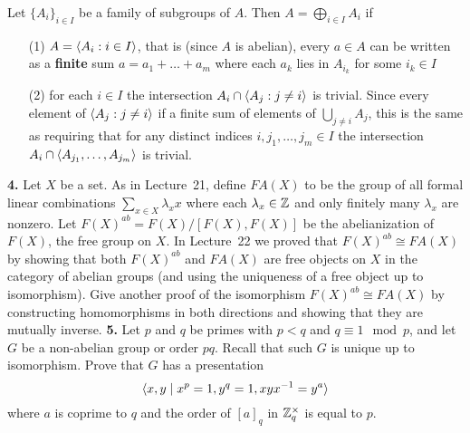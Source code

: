 \documentclass[12pt]{amsart}
\begin{document}
Let $\{A_i\}_{i\in I}$ be a family of subgroups of $A$. Then $A=\bigoplus_{i\in I} A_i$ if
\begin{itemize}
\item[(1)] $A={\langle} A_i: i\in I{\rangle}$, that is (since $A$ is abelian), every $a\in A$ can be written as a {\bf finite} sum $a=a_1+\ldots+ a_m$
where each $a_k$ lies in $A_{i_k}$ for some $i_k\in I$ 
\item[(2)] for each $i\in I$ the intersection $A_i\cap {\langle} A_j: j\neq i{\rangle}$ is trivial. Since every element of ${\langle} A_j: j\neq i{\rangle}$
if a finite sum of elements of $\bigcup_{j\neq i}A_j$, this is the same as requiring that for any distinct indices $i,j_1,\ldots, j_m\in I$
the intersection $A_i\cap {\langle} A_{j_1},\ldots, A_{j_m}{\rangle}$ is trivial.
\end{itemize}
{\bf 4.} Let $X$ be a set. As in Lecture~21, define $FA(X)$ to be the group of all formal linear combinations $\sum\limits_{x\in X} \lambda_x x$
where each $\lambda_x\in{\mathbb Z}$ and only finitely many $\lambda_x$ are nonzero. Let $F(X)^{ab}=F(X)/[F(X),F(X)]$ be the abelianization of
$F(X)$, the free group on $X$.
\skv
In Lecture~22 we proved that $F(X)^{ab}\cong FA(X)$ by showing that both $F(X)^{ab}$ and  $FA(X)$ are free objects on $X$ in the category
of abelian groups (and using the uniqueness of a free object up to isomorphism). Give another proof of the isomorphism $F(X)^{ab}\cong FA(X)$
by constructing homomorphisms in both directions and showing that they are mutually inverse.
\skv
{\bf 5.} 
Let $p$ and $q$ be primes with $p<q$ and $q\equiv 1\mod p$, and let $G$ be a non-abelian group or order $pq$. Recall that such $G$ is unique up to isomorphism. Prove that $G$ has a presentation $${\langle} x,y\mid x^p=1, y^q=1, xyx^{-1}=y^a {\rangle}$$ where $a$ is coprime to $q$ and the order of 
$[a]_q$ in ${\mathbb Z}_q^{\times}$ is equal to $p$.
\end{document}
